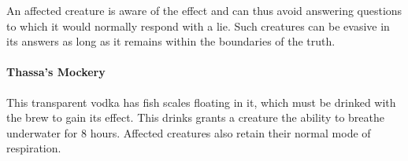    An affected creature is aware of the effect and can thus avoid answering questions to which it would normally respond with a lie.
    Such creatures can be evasive in its answers as long as it remains within the boundaries of the truth.
\paragraph{Thassa's Mockery} %
    This transparent vodka has fish scales floating in it, which must be drinked with the brew to gain its effect.
    This drinks grants a creature the ability to breathe underwater for 8 hours.
    Affected creatures also retain their normal mode of respiration.
